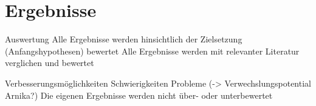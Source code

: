 \section{Ergebnisse}

Auswertung
Alle Ergebnisse werden hinsichtlich der Zielsetzung (Anfangshypothesen) bewertet
Alle Ergebnisse werden mit relevanter Literatur verglichen und bewertet

Verbesserungsmöglichkeiten
Schwierigkeiten Probleme (-> Verwechslungspotential Arnika?) 
Die eigenen Ergebnisse werden nicht über- oder unterbewertet
